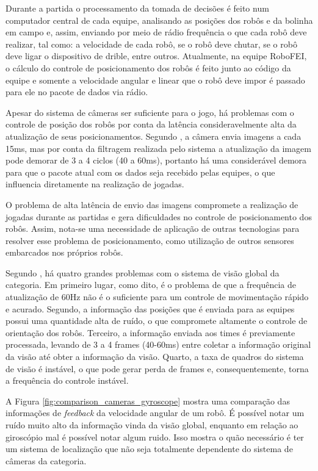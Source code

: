 \documentclass[acronym, symbols, table]{fei}
\begin{document}
			Durante a partida o processamento da tomada de decisões é feito num computador central de cada equipe, analisando as posições dos robôs e da bolinha em campo e, assim, enviando por meio de rádio frequência o que cada robô deve realizar, tal como: a velocidade de cada robô, se o robô deve chutar, se o robô deve ligar o dispositivo de drible, entre outros. Atualmente, na equipe RoboFEI, o cálculo do controle de posicionamento dos robôs é feito junto ao código da equipe e somente a velocidade angular e linear que o robô deve impor é passado para ele no pacote de dados via rádio.
		
			Apesar do sistema de câmeras ser suficiente para o jogo, há problemas com o controle de posição dos robôs por conta da latência consideravelmente alta da atualização de seus posicionamentos. Segundo \textcite{tdpZJUNlict2020}, a câmera envia imagens a cada 15ms, mas por conta da filtragem realizada pelo sistema a atualização da imagem pode demorar de 3 a 4 ciclos (40 a 60ms), portanto há uma considerável demora para que o pacote atual com os dados seja recebido pelas equipes, o que influencia diretamente na realização de jogadas.
			
			O problema de alta latência de envio das imagens compromete a realização de jogadas durante as partidas e gera dificuldades no controle de posicionamento dos robôs. Assim, nota-se uma necessidade de aplicação de outras tecnologias para resolver esse problema de posicionamento, como utilização de outros sensores embarcados nos próprios robôs.
			
			Segundo \textcite{tdpZJUNlict2020}, há quatro grandes problemas com o sistema de visão global da categoria. Em primeiro lugar, como dito, é o problema de que a frequência de atualização de 60Hz não é o suficiente para um controle de movimentação rápido e acurado. Segundo, a informação das posições que é enviada para as equipes possui uma quantidade alta de ruído, o que compromete altamente o controle de orientação dos robôs. Terceiro, a informação enviada aos times é previamente processada, levando de 3 a 4 frames (40-60ms) entre coletar a informação original da visão até obter a informação da visão. Quarto, a taxa de quadros do sistema de visão é instável, o que pode gerar perda de frames e, consequentemente, torna a frequência do controle instável.
			
			A Figura \ref{fig:comparison_cameras_gyroscope} mostra uma comparação das informações de \textit{feedback} da velocidade angular de um robô. É possível notar um ruído muito alto da informação vinda da visão global, enquanto em relação ao giroscópio mal é possível notar algum ruido. Isso mostra o quão necessário é ter um sistema de localização que não seja totalmente dependente do sistema de câmeras da categoria.
			
\end{document}
